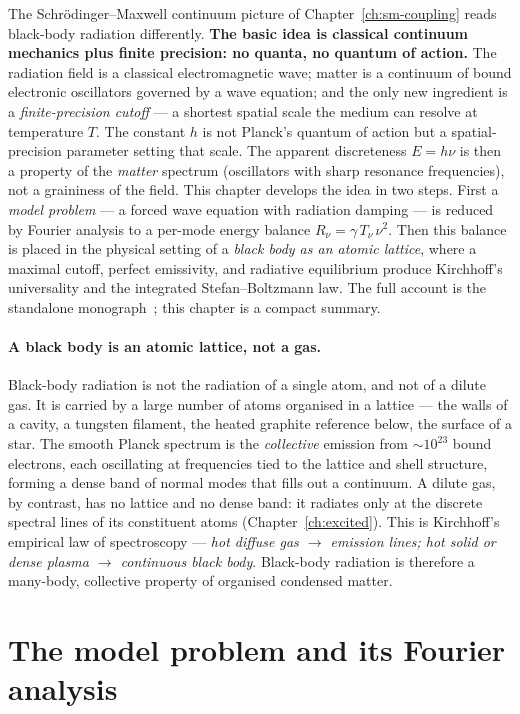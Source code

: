 The Schr\"odinger--Maxwell continuum picture of Chapter~\ref{ch:sm-coupling} reads black-body radiation differently. \textbf{The basic idea is classical continuum mechanics plus finite precision: no quanta, no quantum of action.} The radiation field is a classical electromagnetic wave; matter is a continuum of bound electronic oscillators governed by a wave equation; and the only new ingredient is a \emph{finite-precision cutoff} --- a shortest spatial scale the medium can resolve at temperature $T$. The constant $h$ is not Planck's quantum of action but a spatial-precision parameter setting that scale. The apparent discreteness $E = h\nu$ is then a property of the \emph{matter} spectrum (oscillators with sharp resonance frequencies), not a graininess of the field. This chapter develops the idea in two steps. First a \emph{model problem} --- a forced wave equation with radiation damping --- is reduced by Fourier analysis to a per-mode energy balance $R_\nu = \gamma\, T_\nu\, \nu^2$. Then this balance is placed in the physical setting of a \emph{black body as an atomic lattice}, where a maximal cutoff, perfect emissivity, and radiative equilibrium produce Kirchhoff's universality and the integrated Stefan--Boltzmann law. The full account is the standalone monograph~\cite{BlackbodySlayer}; this chapter is a compact summary.

\paragraph{A black body is an atomic lattice, not a gas.}
Black-body radiation is not the radiation of a single atom, and not of a dilute gas. It is carried by a large number of atoms organised in a lattice --- the walls of a cavity, a tungsten filament, the heated graphite reference below, the surface of a star. The smooth Planck spectrum is the \emph{collective} emission from $\sim 10^{23}$ bound electrons, each oscillating at frequencies tied to the lattice and shell structure, forming a dense band of normal modes that fills out a continuum. A dilute gas, by contrast, has no lattice and no dense band: it radiates only at the discrete spectral lines of its constituent atoms (Chapter~\ref{ch:excited}). This is Kirchhoff's empirical law of spectroscopy --- \emph{hot diffuse gas $\to$ emission lines; hot solid or dense plasma $\to$ continuous black body}. Black-body radiation is therefore a many-body, collective property of organised condensed matter.

\section{The model problem and its Fourier analysis}\label{sec:1d-wave-model}\label{sec:RF-proof}

